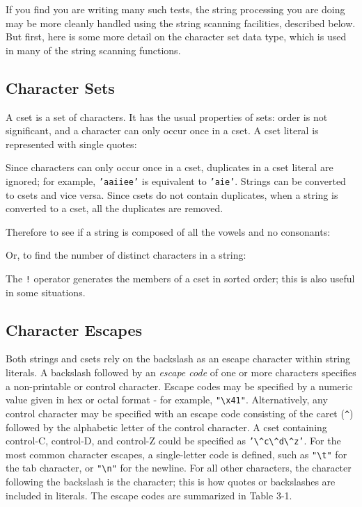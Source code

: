 If you find you are writing many such tests, the string processing you
are doing may be more cleanly handled using the string scanning
facilities, described below. But first, here is some more detail on the
character set data type, which is used in many of the string scanning
functions.

\subsection{Character Sets}

A cset is a set of characters. It has the usual properties of sets:
order is not significant, and a character can only occur once in a
cset. A cset literal is represented with single
quotes:


Since characters can only occur once in a cset, duplicates in a cset
literal are ignored; for example,
\texttt{'aaiiee'} is equivalent to
\texttt{'aie'}. Strings can be
converted to csets and vice versa. Since csets do not contain
duplicates, when a string is converted to a cset, all the duplicates
are removed.

Therefore to see if a string is composed of all the vowels and no
consonants:


Or, to find the number of distinct characters in a string:


The \texttt{!} operator generates the members of a cset in sorted order;
this is also useful in some situations.

\subsection{Character Escapes}

Both strings and csets rely on the backslash as an escape character
within string literals. A backslash followed by an \textit{escape code} of one or more characters specifies a
non-printable or control character. Escape codes may be specified by a
numeric value given in hex or octal format - for example,
\texttt{"{\textbackslash}x41"}.
Alternatively, any control character may be specified with an escape
code consisting of the caret (\texttt{\^{}}) followed by the alphabetic
letter of the control character. A cset containing control-C,
control-D, and control-Z could be specified as
\texttt{'{\textbackslash}\^{}c{\textbackslash}\^{}d{\textbackslash}\^{}z'}.
For the most common character escapes, a single-letter code is defined,
such as \texttt{"{\textbackslash}t"} for
the tab character, or
\texttt{"{\textbackslash}n"} for the
newline. For all other characters, the character following the
backslash is the character; this is how quotes or backslashes are
included in literals. The escape codes are summarized in Table 3-1.

